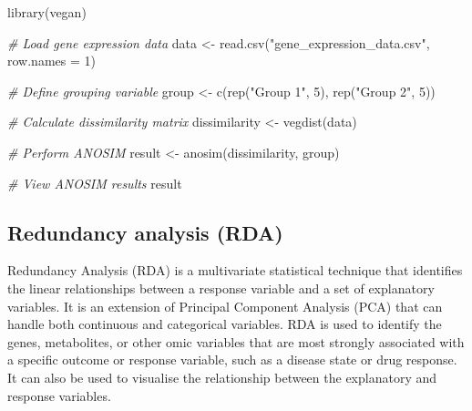 \documentclass[
]{book}
\newenvironment{Shaded}{\begin{snugshade}}{\end{snugshade}}
\newcommand{\AttributeTok}[1]{\textcolor[rgb]{0.77,0.63,0.00}{#1}}
\newcommand{\CommentTok}[1]{\textcolor[rgb]{0.56,0.35,0.01}{\textit{#1}}}
\newcommand{\DecValTok}[1]{\textcolor[rgb]{0.00,0.00,0.81}{#1}}
\newcommand{\FunctionTok}[1]{\textcolor[rgb]{0.00,0.00,0.00}{#1}}
\newcommand{\NormalTok}[1]{#1}
\newcommand{\OtherTok}[1]{\textcolor[rgb]{0.56,0.35,0.01}{#1}}
\newcommand{\StringTok}[1]{\textcolor[rgb]{0.31,0.60,0.02}{#1}}
\begin{document}
\begin{Shaded}
\begin{Highlighting}[]
\FunctionTok{library}\NormalTok{(vegan)}

\CommentTok{\# Load gene expression data}
\NormalTok{data }\OtherTok{\textless{}{-}} \FunctionTok{read.csv}\NormalTok{(}\StringTok{"gene\_expression\_data.csv"}\NormalTok{, }\AttributeTok{row.names =} \DecValTok{1}\NormalTok{)}

\CommentTok{\# Define grouping variable}
\NormalTok{group }\OtherTok{\textless{}{-}} \FunctionTok{c}\NormalTok{(}\FunctionTok{rep}\NormalTok{(}\StringTok{"Group 1"}\NormalTok{, }\DecValTok{5}\NormalTok{), }\FunctionTok{rep}\NormalTok{(}\StringTok{"Group 2"}\NormalTok{, }\DecValTok{5}\NormalTok{))}

\CommentTok{\# Calculate dissimilarity matrix}
\NormalTok{dissimilarity }\OtherTok{\textless{}{-}} \FunctionTok{vegdist}\NormalTok{(data)}

\CommentTok{\# Perform ANOSIM}
\NormalTok{result }\OtherTok{\textless{}{-}} \FunctionTok{anosim}\NormalTok{(dissimilarity, group)}

\CommentTok{\# View ANOSIM results}
\NormalTok{result}
\end{Highlighting}
\end{Shaded}

\normalsize

\hypertarget{redundancy-analysis}{%
\subsection{Redundancy analysis (RDA)}\label{redundancy-analysis}}

Redundancy Analysis (RDA) is a multivariate statistical technique that identifies the linear relationships between a response variable and a set of explanatory variables. It is an extension of Principal Component Analysis (PCA) that can handle both continuous and categorical variables. RDA is used to identify the genes, metabolites, or other omic variables that are most strongly associated with a specific outcome or response variable, such as a disease state or drug response. It can also be used to visualise the relationship between the explanatory and response variables.

\small
\end{document}

